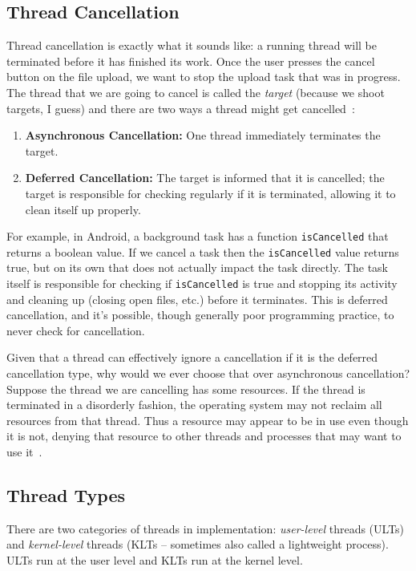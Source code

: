 \subsection*{Thread Cancellation}
Thread cancellation is exactly what it sounds like: a running thread will be terminated before it has finished its work. Once the user presses the cancel button on the file upload, we want to stop the upload task that was in progress. The thread that we are going to cancel is called the \textit{target} (because we shoot targets, I guess) and there are two ways a thread might get cancelled~\cite{osc}:

\begin{enumerate}
	\item \textbf{Asynchronous Cancellation:} One thread immediately terminates the target.
	\item \textbf{Deferred Cancellation:} The target is informed that it is cancelled; the target is responsible for checking regularly if it is terminated, allowing it to clean itself up properly. 
\end{enumerate}

For example, in Android, a background task has a function \texttt{isCancelled} that returns a boolean value. If we cancel a task then the \texttt{isCancelled} value returns true, but on its own that does not actually impact the task directly. The task itself is responsible for checking if \texttt{isCancelled} is true and stopping its activity and cleaning up (closing open files, etc.) before it terminates. This is deferred cancellation, and it's possible, though generally poor programming practice, to never check for cancellation.

Given that a thread can effectively ignore a cancellation if it is the deferred cancellation type, why would we ever choose that over asynchronous cancellation? Suppose the thread we are cancelling has some resources. If the thread is terminated in a disorderly fashion, the operating system may not reclaim all resources from that thread. Thus a resource may appear to be in use even though it is not, denying that resource to other threads and processes that may want to use it~\cite{osc}.

\subsection*{Thread Types}

There are two categories of threads in implementation: \textit{user-level} threads (ULTs) and \textit{kernel-level} threads (KLTs -- sometimes also called a lightweight process). ULTs run at the user level and KLTs run at the kernel level.

